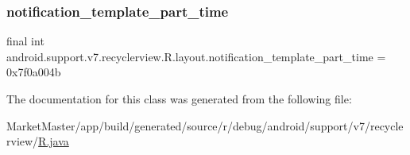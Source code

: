 \subsubsection{\texorpdfstring{notification\+\_\+template\+\_\+part\+\_\+time}{notification\_template\_part\_time}}
{\footnotesize\ttfamily final int android.\+support.\+v7.\+recyclerview.\+R.\+layout.\+notification\+\_\+template\+\_\+part\+\_\+time = 0x7f0a004b\hspace{0.3cm}{\ttfamily [static]}}



The documentation for this class was generated from the following file\+:\begin{DoxyCompactItemize}
\item 
Market\+Master/app/build/generated/source/r/debug/android/support/v7/recyclerview/\mbox{\hyperlink{debug_2android_2support_2v7_2recyclerview_2R_8java}{R.\+java}}\end{DoxyCompactItemize}
